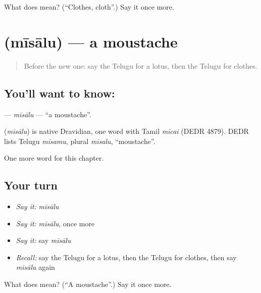 \begin{tcolorbox}[breakable,colback=teal!4,colframe=teal!35!black,title={Before you move on}]
What does  mean? (\textquotedblleft{}Clothes, cloth\textquotedblright{}.) Say it once more.
\end{tcolorbox}
\section[\texorpdfstring{\te{మీసాలు} (mīsālu)}{మీసాలు (mīsālu)}]{ (mīsālu) — a moustache}

\label{lesson:TE-C133-misalu}



\begin{quote}
Before the new one: say the Telugu for a lotus, then the Telugu for clothes.
\end{quote}

\subsection*{You'll want to know: }
\textbf{} — \emph{mīsālu} — \textquotedblleft{}a moustache\textquotedblright{}.

\begin{cousinweb}
\textbf{} (\emph{mīsālu}) is native Dravidian, one word with Tamil \emph{mīcai} (DEDR 4879). DEDR lists Telugu \emph{mīsamu}, plural \emph{mīsalu}, \textquotedblleft{}moustache\textquotedblright{}.
\end{cousinweb}

\begin{grammarlens}[title={What you've built}]
One more word for this chapter.
\end{grammarlens}

\subsection*{Your turn}
\begin{itemize}
\raggedright
  \item \emph{Say it:} \emph{mīsālu}
  \item \emph{Say it:} \emph{mīsālu}, once more
  \item \emph{Say it:} say \emph{mīsālu}
  \item \emph{Recall:} say the Telugu for a lotus, then the Telugu for clothes, then say \emph{mīsālu} again
\end{itemize}

\begin{tcolorbox}[breakable,colback=teal!4,colframe=teal!35!black,title={Before you move on}]
What does  mean? (\textquotedblleft{}A moustache\textquotedblright{}.) Say it once more.
\end{tcolorbox}
